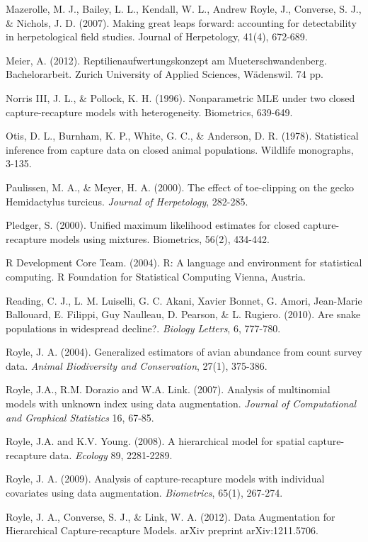 \documentclass{book}
\begin{document}
\rf Mazerolle, M. J., Bailey, L. L., Kendall, W. L., Andrew Royle, J., Converse, S. J., \& Nichols, J. D. (2007). Making great leaps forward: accounting for detectability in herpetological field studies. Journal of Herpetology, 41(4), 672-689.

\rf Meier, A. (2012). Reptilienaufwertungskonzept am
Mueterschwandenberg. Bachelorarbeit. Zurich University of Applied
Sciences, Wädenswil. 74 pp.

\rf Norris III, J. L., \& Pollock, K. H. (1996). Nonparametric MLE under two closed capture-recapture models with heterogeneity. Biometrics, 639-649.

\rf Otis, D. L., Burnham, K. P., White, G. C., \& Anderson, D. R. (1978). Statistical inference from capture data on closed animal populations. Wildlife monographs, 3-135.

\rf Paulissen, M. A., \& Meyer, H. A. (2000). The effect of toe-clipping on the gecko Hemidactylus turcicus. \textit{Journal of Herpetology}, 282-285.

\rf Pledger, S. (2000). Unified maximum likelihood estimates for closed capture-recapture models using mixtures. Biometrics, 56(2), 434-442.

\rf R Development Core Team. (2004). R: A language and environment for statistical computing. R Foundation for Statistical Computing Vienna, Austria.

\rf Reading, C. J., L. M. Luiselli, G. C. Akani, Xavier Bonnet, G. Amori, Jean-Marie Ballouard, E. Filippi, Guy Naulleau, D. Pearson, \& L. Rugiero. (2010). Are snake populations in widespread decline?. \textit{Biology Letters}, 6, 777-780.

\rf Royle, J. A. (2004). Generalized estimators of avian abundance from count survey data. \textit{Animal Biodiversity and Conservation}, 27(1), 375-386.

\rf Royle, J.A., R.M. Dorazio and W.A. Link. (2007). Analysis of multinomial models with unknown index using data augmentation. {\it Journal of Computational and Graphical Statistics}  16, 67-85.

\rf  Royle, J.A. and K.V. Young. (2008). A hierarchical model for spatial capture-recapture data. {\it Ecology}  89, 2281-2289.

\rf Royle, J. A. (2009). Analysis of capture-recapture models with individual covariates using data augmentation. {\it Biometrics}, 65(1), 267-274.

\rf Royle, J. A., Converse, S. J., \& Link, W. A. (2012). Data Augmentation for Hierarchical Capture-recapture Models. arXiv preprint arXiv:1211.5706.
\end{document}
